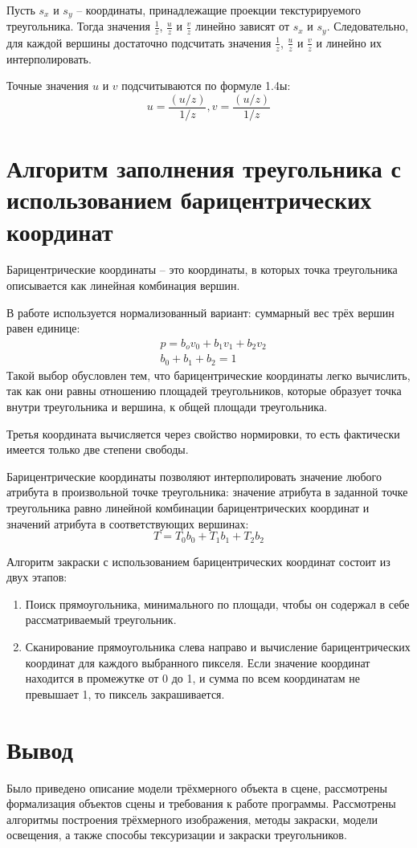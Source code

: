 Пусть $s_x$ и $s_y$ -- координаты, принадлежащие проекции текстурируемого треугольника.
Тогда значения $ \frac{1}{z} $, $ \frac{u}{z} $ и $ \frac{v}{z} $ линейно зависят от $s_x$ и $s_y$.
Следовательно, для каждой вершины достаточно подсчитать значения $ \frac{1}{z} $, $ \frac{u}{z} $ и $ \frac{v}{z} $ и
линейно их интерполировать.

Точные значения $ u $ и $ v $ подсчитываются по формуле 1.4ы: 
\begin{equation}
u = \frac{(u/z)}{1/z},  v = \frac{(u/z)}{1/z} 
\end{equation}

\section{Алгоритм заполнения треугольника с использованием барицентрических координат}
Барицентрические координаты -- это координаты, в которых точка треугольника описывается как линейная комбинация вершин. \cite{rojers}

В работе используется нормализованный вариант: суммарный вес трёх вершин равен единице:
\begin{equation}
\begin{aligned}
& p = b_ov_0 + b_1v_1 + b_2v_2 \\ 
&b_0 + b_1 + b_2 = 1
\end{aligned}
\end{equation} 
Такой выбор обусловлен тем, что барицентрические координаты легко вычислить, так как они равны отношению площадей треугольников, которые образует точка внутри треугольника и вершина, к общей площади треугольника.

Третья координата вычисляется через свойство нормировки, то есть фактически имеется только две степени свободы.

Барицентрические координаты позволяют интерполировать значение любого атрибута в произвольной точке треугольника: значение атрибута в заданной точке треугольника равно линейной комбинации барицентрических координат и значений атрибута в соответствующих вершинах:
\begin{equation}
	T = T_0b_0 + T_1b_1 + T_2b_2
\end{equation}

Алгоритм закраски с использованием барицентрических координат состоит из двух этапов:
\begin{enumerate}
	\item Поиск прямоугольника, минимального по площади, чтобы он содержал в себе рассматриваемый треугольник.
	\item Сканирование прямоугольника слева направо и вычисление барицентрических координат для каждого выбранного пикселя. Если значение координат находится в промежутке от 0 до 1, и сумма по всем координатам не превышает 1, то пиксель закрашивается.
\end{enumerate}

\section{Вывод}
Было приведено описание модели трёхмерного объекта в сцене,
рассмотрены формализация объектов сцены и требования к работе программы.
Рассмотрены алгоритмы построения трёхмерного изображения, методы закраски, модели освещения, а также способы тексуризации и закраски треугольников.